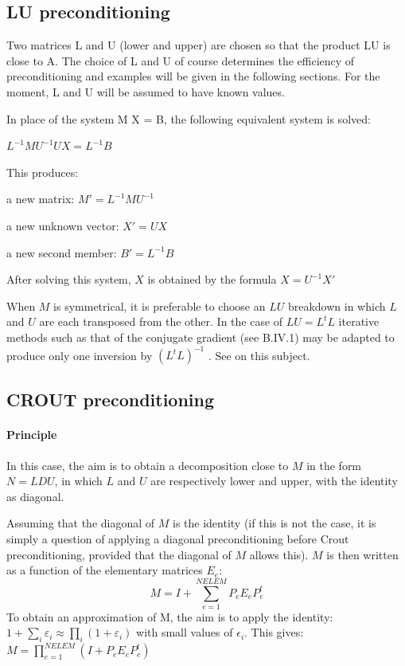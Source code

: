 \subsection{LU preconditioning}

Two matrices L and U (lower and upper) are chosen so that the product LU is
close to A. The choice of L and U of course determines the efficiency of
preconditioning and examples will be given in the following sections. For the
moment, L and U will be assumed to have known values.

In place of the system M X = B, the following equivalent system is solved:

$L^{-1} M U^{-1} U X  =  L^{-1} B$



This produces:



a new matrix: $M' = L^{-1} M U^{-1}$

a new unknown vector: $X' = U X$

a new second member: $B' = L^{-1} B$



After solving this system, $X$ is obtained by the formula $X = U^{-1} X'$

When $M$ is symmetrical, it is preferable to choose an $LU$ breakdown in which
$L$ and $U$ are each transposed from the other. In the case of $LU = L^{t}L$
iterative methods such as that of the conjugate gradient (see
B.IV.1) may be adapted to produce only one inversion by
$(L^{t}L)^{-1}$ . See \citet{Hervouet1911} on this subject.

\subsection{CROUT preconditioning}

\paragraph{Principle}

In this case, the aim is to obtain a decomposition close to $M$ in the form $N
= LDU$, in which $L$ and $U$ are respectively lower and upper, with the
identity as diagonal.

Assuming that the diagonal of $M$ is the identity (if this is not the case, it is
simply a question of applying a diagonal preconditioning before Crout
preconditioning, provided that the diagonal of $M$ allows this). $M$ is then
written as a function of the elementary matrices $E_{e}$:
\[M=I+\sum _{e=1}^{NELEM}P_{e} E_{e} P_{e}^{t}  \]
To obtain an approximation of M, the aim is to apply the identity:
$1+\sum _{i}\varepsilon _{i}  \approx \prod _{i}(1+\varepsilon _{i} ) $ with
small values of $\epsilon _{i}$. This gives: $M=\prod _{e=1}^{NELEM}(I+P_{e} E_{e} P_{e}^{t}
) $

